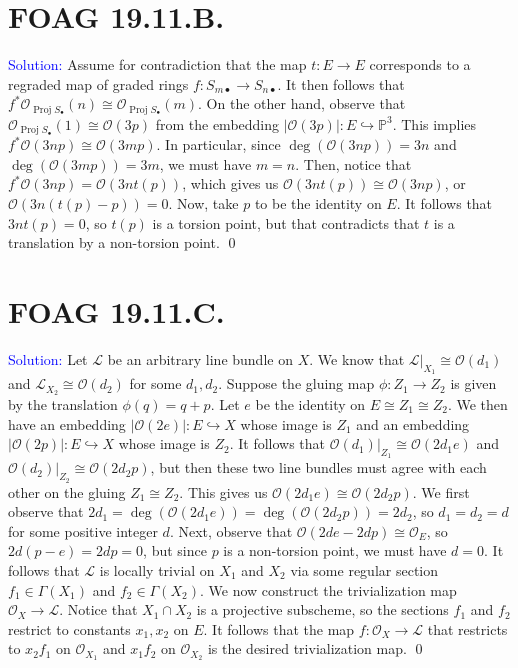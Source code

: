 \documentclass[11pt]{article}
\newcommand{\PP}{\mathbb{P}}
\newcommand{\cL}{\mathcal{L}}
\newcommand{\cO}{\mathcal{O}}
\newcommand{\Proj}{\operatorname{Proj}}
\newenvironment{solution}{\begin{trivlist}\item[]{\textcolor{blue}{Solution:}}}{\qed \end{trivlist}}
\begin{document}
\newpage

\section*{FOAG 19.11.B.}

\begin{solution}
	Assume for contradiction that the map $t: E \rightarrow E$ corresponds to a regraded map of graded rings $f: S_{m \bullet} \rightarrow S_{n \bullet}$. It then follows that $f^* \cO_{\Proj S_{\bullet}}(n) \cong \cO_{\Proj S_{\bullet}}(m)$. On the other hand, observe that $\cO_{\Proj S_{\bullet}}(1) \cong \cO(3p)$ from the embedding $|\cO(3p)|: E \hookrightarrow \PP^3$. This implies $f^* \cO(3np) \cong \cO(3mp)$. In particular, since $\deg (\cO(3np)) = 3n$ and $\deg (\cO(3mp)) = 3m$, we must have $m = n$. Then, notice that $f^* \cO(3np) = \cO(3n t(p))$, which gives us $\cO(3nt(p)) \cong \cO(3np)$, or $\cO(3n(t(p) - p)) = 0$. Now, take $p$ to be the identity on $E$. It follows that $3nt(p) = 0$, so $t(p)$ is a torsion point, but that contradicts that $t$ is a translation by a non-torsion point. 
\end{solution}

\newpage

\section*{FOAG 19.11.C.}

\begin{solution}
	Let $\cL$ be an arbitrary line bundle on $X$. We know that $\cL|_{X_1} \cong \cO(d_1)$ and $\cL_{X_2} \cong \cO(d_2)$ for some $d_1, d_2$. Suppose the gluing map $\phi: Z_1 \rightarrow Z_2$ is given by the translation $\phi(q) = q + p$. Let $e$ be the identity on $E \cong Z_1 \cong Z_2$. We then have an embedding $|\cO(2e)|: E \hookrightarrow X$ whose image is $Z_1$ and an embedding $|\cO(2p)|: E \hookrightarrow X$ whose image is $Z_2$. It follows that $\cO(d_1)|_{Z_1} \cong \cO(2d_1e)$ and $\cO(d_2)|_{Z_2} \cong \cO(2d_2 p)$, but then these two line bundles must agree with each other on the gluing $Z_1 \cong Z_2$. This gives us $\cO(2d_1e) \cong \cO(2d_2 p)$. We first observe that $2d_1 = \deg (\cO(2d_1e)) = \deg (\cO(2d_2p)) = 2d_2$, so $d_1 = d_2 = d$ for some positive integer $d$. Next, observe that $\cO(2de - 2dp) \cong \cO_E$, so $2d(p - e) = 2dp = 0$, but since $p$ is a non-torsion point, we must have $d = 0$. It follows that $\cL$ is locally trivial on $X_1$ and $X_2$ via some regular section $f_1 \in \Gamma(X_1)$ and $f_2 \in \Gamma(X_2)$. We now construct the trivialization map $\cO_X \rightarrow \cL$. Notice that $X_1 \cap X_2$ is a projective subscheme, so the sections $f_1$ and $f_2$ restrict to constants $x_1, x_2$ on $E$. It follows that the map $f: \cO_X \rightarrow \cL$ that restricts to $x_2 f_1$ on $\cO_{X_1}$ and $x_1 f_2$ on $\cO_{X_2}$ is the desired trivialization map. 
\end{solution}
\end{document}

